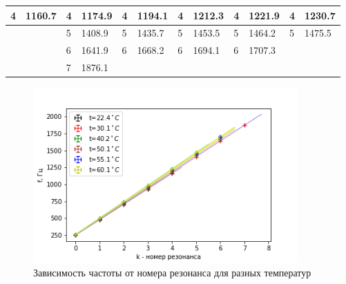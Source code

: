\documentclass[a4paper,12pt]{article} %
\begin{document}
\begin{table}[h!]
\begin{tabular}{|ll|ll|ll|ll|ll|ll|}
\multicolumn{1}{|l|}{4}      & 1160.7     & \multicolumn{1}{l|}{4}      & 1174.9     & \multicolumn{1}{l|}{4}     & 1194.1     & \multicolumn{1}{l|}{4}      & 1212.3     & \multicolumn{1}{l|}{4}      & 1221.9     & \multicolumn{1}{l|}{4}      & 1230.7     \\ \hline
\multicolumn{1}{|l|}{}       &            & \multicolumn{1}{l|}{5}      & 1408.9     & \multicolumn{1}{l|}{5}     & 1435.7     & \multicolumn{1}{l|}{5}      & 1453.5     & \multicolumn{1}{l|}{5}      & 1464.2     & \multicolumn{1}{l|}{5}      & 1475.5     \\ \hline
\multicolumn{1}{|l|}{}       &            & \multicolumn{1}{l|}{6}      & 1641.9     & \multicolumn{1}{l|}{6}     & 1668.2     & \multicolumn{1}{l|}{6}      & 1694.1     & \multicolumn{1}{l|}{6}      & 1707.3     & \multicolumn{1}{l|}{}       &            \\ \hline
\multicolumn{1}{|l|}{}       &            & \multicolumn{1}{l|}{7}      & 1876.1     & \multicolumn{1}{l|}{}      &            & \multicolumn{1}{l|}{}       &            & \multicolumn{1}{l|}{}       &            & \multicolumn{1}{l|}{}       &            \\ \hline
\end{tabular}
\end{table}

\begin{figure}[h!]
\begin{center}
\includegraphics[width=0.9\textwidth]{temperature}
\end{center}
\caption{Зависимость частоты от номера резонанса для разных температур} \label{temperature}
\end{figure}
\end{document}
